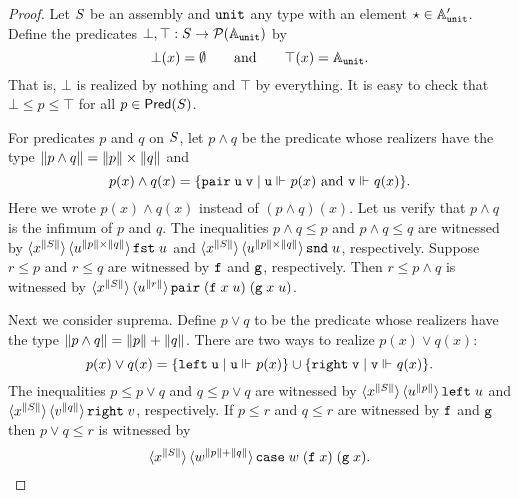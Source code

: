\begin{proof}
  Let $S$ be an assembly and $\mathtt{unit}$ any type with an element
  ${\star} \in \mathbb{A}'_{\mathtt{unit}}$. Define the predicates $\bot, \top :
  S \to \mathcal{P}(\mathbb{A}_{\mathtt{unit}})$ by
  \begin{equation*}
    \bot(x) = \emptyset
    \qquad\text{and}\qquad
    \top(x) = \mathbb{A}_{\mathtt{unit}}.
  \end{equation*}
  That is, $\bot$ is realized by nothing and $\top$ by everything. It is
  easy to check that $\bot \leq p \leq \top$ for all $p \in
  \mathsf{Pred}(S)$.

  For predicates $p$ and $q$ on $S$, let $p \land q$ be the
  predicate whose realizers have the type $\|p \land q\| = \|p\| \times
  \|q\|$ and
  \begin{equation*}
    p(x) \land q(x) = \{\mathtt{pair}\;\mathtt{u}\;\mathtt{v} \mid
    \text{$\mathtt{u} \Vdash_{} p(x)$ and $\mathtt{v} \Vdash_{} q(x)$}\}.
  \end{equation*}
  Here we wrote $p(x) \land q(x)$ instead of $(p \land q)(x)$. Let us
  verify that $p \land q$ is the infimum of $p$ and $q$. The
  inequalities $p \land q \leq p$ and $p \land q \leq q$ are witnessed
  by $\langle x^{\|S\|} \rangle\, \langle u^{\|p\| \times \|q\|} \rangle\,{\mathtt{fst}\;u}$
  and $\langle x^{\|S\|} \rangle\, \langle u^{\|p\| \times
      \|q\|} \rangle\,{\mathtt{snd}\;u}$, respectively. Suppose $r \leq p$ and $r
  \leq q$ are witnessed by $\mathtt{f}$ and $\mathtt{g}$, respectively. Then $r
  \leq p \land q$ is witnessed by $\langle x^{\|S\|} \rangle\,
    \langle u^{\|r\|} \rangle\,{\mathtt{pair}\; (\mathtt{f}\;x\;u)\; (\mathtt{g}\;x\;u)}$.

  Next we consider suprema. Define $p \lor q$ to be the predicate
  whose realizers have the type $\|p \land q\| = \|p\| + \|q\|$. There are
  two ways to realize $p(x) \lor q(x)$:
  \begin{equation*}
    p(x) \lor q(x) =
    \{\mathtt{left}\;\mathtt{u} \mid \mathtt{u} \Vdash_{} p(x)\} \cup
    \{\mathtt{right}\;\mathtt{v} \mid \mathtt{v} \Vdash_{} q(x)\}.
  \end{equation*}
  The inequalities $p \leq p \lor q$ and $q \leq p \lor q$ are
  witnessed by $\langle x^{\|S\|} \rangle\, \langle u^{\|p\|} \rangle\,{\mathtt{left}\;u}$
  and $\langle x^{\|S\|} \rangle\, \langle v^{\|q\|} \rangle\,{\mathtt{right}\;v}$,
  respectively. If $p \leq r$ and $q \leq r$ are witnessed by $\mathtt{f}$
  and $\mathtt{g}$ then $p \lor q \leq r$ is witnessed by
  \begin{equation*}
    \langle x^{\|S\|} \rangle\, \langle w^{\|p\|+\|q\|} \rangle\,{
      \mathtt{case}\;w\;(\mathtt{f}\;x)\;(\mathtt{g}\;x)
    }.
  \end{equation*}
  

\end{proof}
